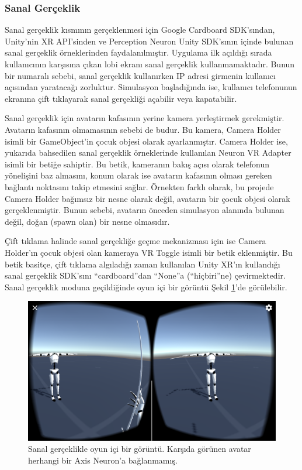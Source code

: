 \documentclass[a4paper, 12pt, titlepage]{article}
\begin{document}
\subsubsection{Sanal Gerçeklik}

Sanal gerçeklik kısmının gerçeklenmesi için Google Cardboard SDK’sından, Unity’nin XR API’sinden ve
Perception Neuron Unity SDK’sının içinde bulunan sanal gerçeklik örneklerinden faydalanılmıştır.
Uygulama ilk açıldığı sırada kullanıcının karşısına çıkan lobi ekranı sanal gerçeklik
kullanmamaktadır. Bunun bir numaralı sebebi, sanal gerçeklik kullanırken IP adresi girmenin
kullanıcı açısından yaratacağı zorluktur. Simulasyon başladığında ise, kullanıcı telefonunun
ekranına çift tıklayarak sanal gerçekliği açabilir veya kapatabilir.

Sanal gerçeklik için avatarın kafasının yerine kamera yerleştirmek gerekmiştir. Avatarın kafasının
olmamasının sebebi de budur. Bu kamera, Camera Holder isimli bir GameObject’in çocuk objesi olarak
ayarlanmıştır. Camera Holder ise, yukarıda bahsedilen sanal gerçeklik örneklerinde kullanılan
Neuron VR Adapter isimli bir betiğe sahiptir. Bu betik, kameranın bakış açısı olarak telefonun
yönelişini baz almasını, konum olarak ise avatarın kafasının olması gereken bağlantı noktasını
takip etmesini sağlar. Örnekten farklı olarak, bu projede Camera Holder bağımsız bir nesne olarak
değil, avatarın bir çocuk objesi olarak gerçeklenmiştir. Bunun sebebi, avatarın önceden simulasyon
alanında bulunan değil, doğan (spawn olan) bir nesne olmasıdır.

Çift tıklama halinde sanal gerçekliğe geçme mekanizması için ise Camera Holder’ın çocuk objesi olan
kameraya VR Toggle isimli bir betik eklenmiştir. Bu betik basitçe, çift tıklama algıladığı zaman
kullanılan Unity XR’ın kullandığı sanal gerçeklik SDK’sını “cardboard”dan “None”a (“hiçbiri”ne)
çevirmektedir. Sanal gerçeklik moduna geçildiğinde oyun içi bir görüntü Şekil \ref{vr}’de
görülebilir.

\begin{figure}
    \centering
        \includegraphics[width=6in]{images/vr}
    \caption{Sanal gerçeklikle oyun içi bir görüntü. Karşıda görünen avatar herhangi bir Axis        
             Neuron'a bağlanmamış.}
    \label{vr}
\end{figure}
\end{document}
